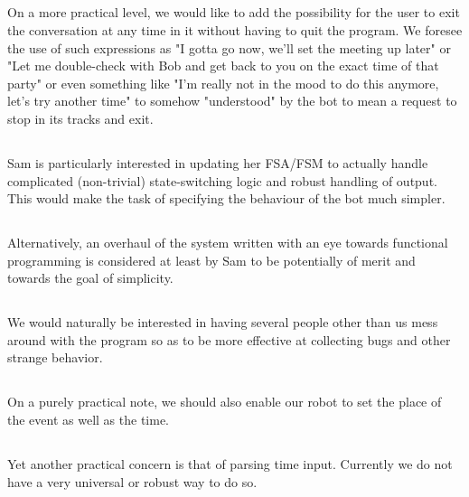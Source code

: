 \documentclass{article} %
\begin{document}
\subsection{}
On a more practical level, we would like to add the possibility for the user to
exit the conversation at any time in it without having to quit the program. We
foresee the use of such expressions as "I gotta go now, we'll set the meeting
up later" or "Let me double-check with Bob and get back to you on the exact
time of that party" or even something like "I'm really not in the mood to do
this anymore, let's try another time" to somehow "understood" by the bot to
mean a request to stop in its tracks and exit.

\subsection{}
Sam is particularly interested in updating her FSA/FSM to actually handle
complicated (non-trivial) state-switching logic and robust handling of output.
This would make the task of specifying the behaviour of the bot much simpler.

\subsection{}
Alternatively, an overhaul of the system written with an eye towards functional
programming is considered at least by Sam to be potentially of merit and
towards the goal of simplicity.

\subsection{}
We would naturally be interested in having several people other than us mess
around with the program so as to be more effective at collecting bugs and other
strange behavior.

\subsection{}
On a purely practical note, we should also enable our robot to set the place of
the event as well as the time.

\subsection{}
Yet another practical concern is that of parsing time input. Currently we do
not have a very universal or robust way to do so.
\end{document}
